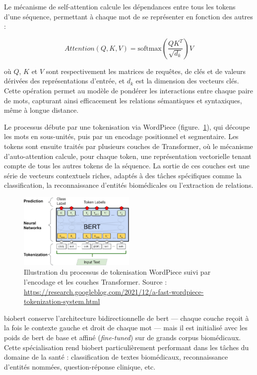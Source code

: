 \documentclass[12pt]{report}
\begin{document}
Le mécanisme de self-attention calcule les dépendances entre tous les tokens d’une séquence, permettant à chaque mot de se représenter en fonction des autres :

\begin{equation}
\textit{Attention}(Q, K, V) = \text{softmax} \left( \frac{QK^{T}}{\sqrt{d_k}} \right) V
\end{equation}

où $Q$, $K$ et $V$ sont respectivement les matrices de requêtes, de clés et de valeurs dérivées des représentations d’entrée, et $d_k$ est la dimension des vecteurs clés. Cette opération permet au modèle de pondérer les interactions entre chaque paire de mots, capturant ainsi efficacement les relations sémantiques et syntaxiques, même à longue distance.

Le processus débute par une tokenisation via WordPiece (figure.~\ref{fig:wordpiece}), qui découpe les mots en sous-unités, puis par un encodage positionnel et segmentaire. Les tokens sont ensuite traités par plusieurs couches de Transformer, où le mécanisme d’auto-attention calcule, pour chaque token, une représentation vectorielle tenant compte de tous les autres tokens de la séquence. La sortie de ces couches est une série de vecteurs contextuels riches, adaptés à des tâches spécifiques comme la classification, la reconnaissance d’entités biomédicales ou l’extraction de relations.

\begin{figure}[H]
    \centering
    \includegraphics[width=0.5\textwidth]{tokenization_bert.png}
    \caption{Illustration du processus de tokenisation WordPiece suivi par l'encodage et les couches Transformer. Source : \url{https://research.googleblog.com/2021/12/a-fast-wordpiece-tokenization-system.html}}
    \label{fig:wordpiece}
\end{figure}

\gls{biobert} conserve l’architecture bidirectionnelle de \gls{bert} — chaque couche reçoit à la fois le contexte gauche et droit de chaque mot — mais il est initialisé avec les poids de \gls{bert} de base et affiné (\textit{fine-tuned}) sur de grands corpus biomédicaux. Cette spécialisation rend \gls{biobert} particulièrement performant dans les tâches du domaine de la santé : classification de textes biomédicaux, reconnaissance d'entités nommées, question-réponse clinique, etc.
\end{document}

